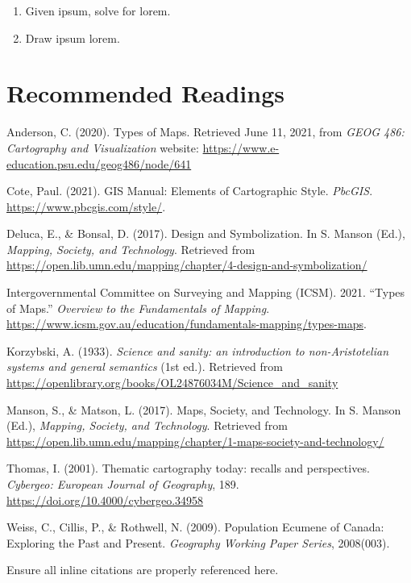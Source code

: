 \documentclass[
]{book}
\providecommand{\tightlist}{%
  \setlength{\itemsep}{0pt}\setlength{\parskip}{0pt}}
\begin{document}
\begin{enumerate}
\def\labelenumi{\arabic{enumi}.}
\setcounter{enumi}{1}
\tightlist
\item
  Given ipsum, solve for lorem.
\item
  Draw ipsum lorem.
\end{enumerate}

\hypertarget{recommended-readings-6}{%
\section*{Recommended Readings}\label{recommended-readings-6}}

Anderson, C. (2020). Types of Maps. Retrieved June 11, 2021, from \emph{GEOG 486: Cartography and Visualization} website: \url{https://www.e-education.psu.edu/geog486/node/641}

Cote, Paul. (2021). GIS Manual: Elements of Cartographic Style. \emph{PbcGIS}. \url{https://www.pbcgis.com/style/}.

Deluca, E., \& Bonsal, D. (2017). Design and Symbolization. In S. Manson (Ed.), \emph{Mapping, Society, and Technology}. Retrieved from \url{https://open.lib.umn.edu/mapping/chapter/4-design-and-symbolization/}

Intergovernmental Committee on Surveying and Mapping (ICSM). 2021. ``Types of Maps.'' \emph{Overview to the Fundamentals of Mapping}. \url{https://www.icsm.gov.au/education/fundamentals-mapping/types-maps}.

Korzybski, A. (1933). \emph{Science and sanity: an introduction to non-Aristotelian systems and general semantics} (1st ed.). Retrieved from \url{https://openlibrary.org/books/OL24876034M/Science_and_sanity}

Manson, S., \& Matson, L. (2017). Maps, Society, and Technology. In S. Manson (Ed.), \emph{Mapping, Society, and Technology}. Retrieved from \url{https://open.lib.umn.edu/mapping/chapter/1-maps-society-and-technology/}

Thomas, I. (2001). Thematic cartography today: recalls and perspectives. \emph{Cybergeo: European Journal of Geography}, 189. \url{https://doi.org/10.4000/cybergeo.34958}

Weiss, C., Cillis, P., \& Rothwell, N. (2009). Population Ecumene of Canada: Exploring the Past and Present. \emph{Geography Working Paper Series}, 2008(003).

Ensure all inline citations are properly referenced here.

  
\end{document}
